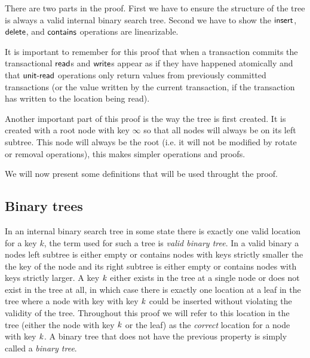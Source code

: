 
There are two parts in the proof.
First we have to ensure the structure of the tree is always a valid internal binary search tree.
Second we have to show the $\act{insert}$, $\act{delete}$, and $\act{contains}$ operations are linearizable.

It is important to remember for this proof that when a transaction commits the transactional $\lit{read}$s and $\lit{write}$s appear as if they have happened atomically
and that $\lit{unit-read}$ operations only return values from previously committed transactions (or the value written by the current transaction, if the transaction has written to the location being read).

Another important part of this proof is the way the tree is first created.
It is created with a root node with key $\infty$ so that all nodes will always be on its left subtree.
This node will always be the root (i.e. it will not be modified by rotate or removal operations), this makes simpler operations and proofs.

We will now present some definitions that will be used throught the proof.


\subsection{Binary trees}
In an internal binary search tree in some state there is exactly one valid location for a key $k$, the term used for such a tree is \emph{valid binary tree}.
In a valid binary a nodes left subtree is either empty or contains nodes with keys strictly smaller the the key of the node and its right subtree
is either empty or contains nodes with keys strictly larger.
A key $\ms{k}$ either exists in the tree at a single node or does not exist in the tree at all, in which case there is exactly one location at a leaf in the tree
where a node with key with key $\ms{k}$ could be inserted without violating the validity of the tree.
Throughout this proof we will refer to this location in the tree (either the node with key $\ms{k}$ or the leaf)
as the \emph{correct} location for a node with key $\ms{k}$.
A binary tree that does not have the previous property is simply called a \emph{binary tree}.

